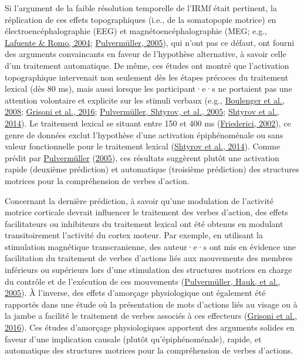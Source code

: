 \documentclass[
  a4paper,12pt,twoside,onecolumn,openright,final,oldfontcommands]{memoir}
\begin{document}
Si l'argument de la faible résolution temporelle de l'IRMf était pertinent, la réplication de ces effets topographiques (i.e., de la somatopopie motrice) en électroencéphalographie (EEG) et magnétoencéphalographie (MEG; e.g., \protect\hyperlink{ref-de_lafuente_language_2004}{Lafuente \& Romo, 2004}; \protect\hyperlink{ref-pulvermuller_brain_2005}{Pulvermüller, 2005}), qui n'ont pas ce défaut, ont fourni des arguments convaincants en faveur de l'hypothèse alternative, à savoir celle d'un traitement automatique. De même, ces études ont montré que l'activation topographique intervenait non seulement dès les étapes précoces du traitement lexical (dès 80 ms), mais aussi lorsque les participant·e·s ne portaient pas une attention volontaire et explicite sur les stimuli verbaux (e.g., \protect\hyperlink{ref-boulenger_subliminal_2008}{Boulenger et al., 2008}; \protect\hyperlink{ref-grisoni_somatotopic_2016}{Grisoni et al., 2016}; \protect\hyperlink{ref-pulvermuller_brain_2005-1}{Pulvermüller, Shtyrov, et al., 2005}; \protect\hyperlink{ref-shtyrov_automatic_2014}{Shtyrov et al., 2014}). Le traitement lexical se situant entre 150 et 400 ms (\protect\hyperlink{ref-friederici_towards_2002}{Friederici, 2002}), ce genre de données exclut l'hypothèse d'une activation épiphénoménale ou sans valeur fonctionnelle pour le traitement lexical (\protect\hyperlink{ref-shtyrov_automatic_2014}{Shtyrov et al., 2014}). Comme prédit par \protect\hyperlink{ref-pulvermuller_brain_2005}{Pulvermüller} (\protect\hyperlink{ref-pulvermuller_brain_2005}{2005}), ces résultats suggèrent plutôt une activation rapide (deuxième prédiction) et automatique (troisième prédiction) des structures motrices pour la compréhension de verbes d'action.

Concernant la dernière prédiction, à savoir qu'une modulation de l'activité motrice corticale devrait influencer le traitement des verbes d'action, des effets facilitateurs ou inhibiteurs du traitement lexical ont été obtenus en modulant transitoirement l'activité du cortex moteur. Par exemple, en utilisant la stimulation magnétique transcranienne, des auteur·e·s ont mis en évidence une facilitation du traitement de verbes d'actions liés aux mouvements des membres inférieurs ou supérieurs lors d'une stimulation des structures motrices en charge du contrôle et de l'exécution de ces mouvements (\protect\hyperlink{ref-pulvermuller_functional_2005}{Pulvermüller, Hauk, et al., 2005}). À l'inverse, des effets d'amorçage physiologique ont également été rapportés dans une étude où la présentation de mots d'actions liés au visage ou à la jambe a facilité le traitement de verbes associés à ces effecteurs (\protect\hyperlink{ref-grisoni_somatotopic_2016}{Grisoni et al., 2016}). Ces études d'amorçage physiologiques apportent des arguments solides en faveur d'une implication causale (plutôt qu'épiphénoménale), rapide, et automatique des structures motrices pour la compréhension de verbes d'actions.
\end{document}
